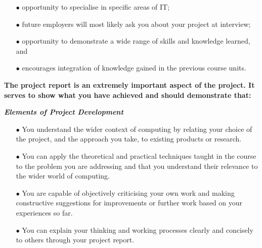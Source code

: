 \begin{enumerate}
\item[$\bullet$]opportunity to specialise in specific areas of IT;
\item[$\bullet$]future employers will most likely ask you about your project at interview;
\item[$\bullet$]opportunity to demonstrate a wide range of skills and knowledge learned, and
\item[$\bullet$]encourages integration of knowledge gained in the previous course units.
\end{enumerate}


\textbf{The project report is an extremely important aspect of the project. It serves to show what you have achieved and should demonstrate that:}

\textbf{\textit{Elements of Project Development}}
\begin{enumerate}


\item[$\bullet$]You understand the wider context of computing by relating your choice of the
project, and the approach you take, to existing products or research.

\item[$\bullet$]You can apply the theoretical and practical techniques taught in the course to
the problem you are addressing and that you understand their relevance to the
wider world of computing.

\item[$\bullet$]You are capable of objectively criticising your own work and making constructive suggestions for improvements or further work based on your experiences so far.

\item[$\bullet$]You can explain your thinking and working processes clearly and concisely to others through your project report.

\end{enumerate}

